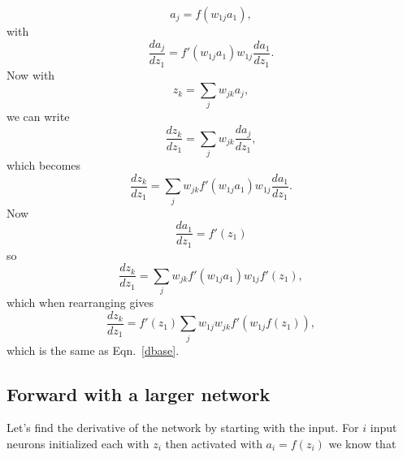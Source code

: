 \documentclass[12pt]{article}
\begin{document}
\begin{equation}
a_j=f(w_{1j}a_1),
\end{equation}
with
\begin{equation}
\label{dcore_idea}
\frac{da_j}{dz_1}=f'(w_{1j}a_1)w_{1j}\frac{da_1}{dz_1}.
\end{equation}
Now with
\begin{equation}
z_k=\sum_j w_{jk} a_j,
\end{equation}
we can write
\begin{equation}
\frac{dz_k}{dz_1}=\sum_j w_{jk}\frac{da_j}{dz_1},
\end{equation}
which becomes
\begin{equation}
\frac{dz_k}{dz_1}=\sum_j w_{jk}f'(w_{1j}a_1)w_{1j}\frac{da_1}{dz_1}.
\end{equation}
Now
\begin{equation}
\frac{da_1}{dz_1}=f'(z_1)
\end{equation}
so
\begin{equation}
\frac{dz_k}{dz_1}=\sum_j w_{jk}f'(w_{1j}a_1)w_{1j}f'(z_1),
\end{equation}
which when rearranging gives
\begin{equation}
\frac{dz_k}{dz_1}=f'(z_1)\sum_j w_{1j} w_{jk}f'(w_{1j}f(z_1)),
\end{equation}
which is the same as Eqn.~\ref{dbase}.

\subsection{Forward with a larger network}

Let's find the derivative of the network by starting with the input. For $i$ input neurons initialized each with $z_i$ then activated with $a_i=f(z_i)$ we know that 
\end{document}
